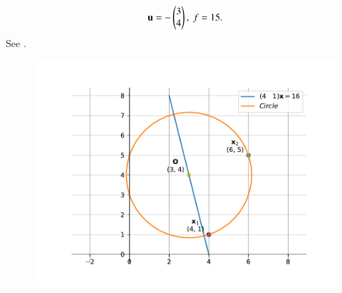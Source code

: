 \begin{align}
	\mathbf{u} = -\begin{pmatrix}3\\4\end{pmatrix},\
	f = 15.
\end{align}
See .
\begin{figure}[H]
	\begin{center} 
	    \includegraphics[width=0.75\columnwidth]{chapters/11/11/1/10/figs/fig.pdf}
	\end{center}
\caption{}
\label{fig:chapters/11/11/1/10Fig1}
\end{figure}





